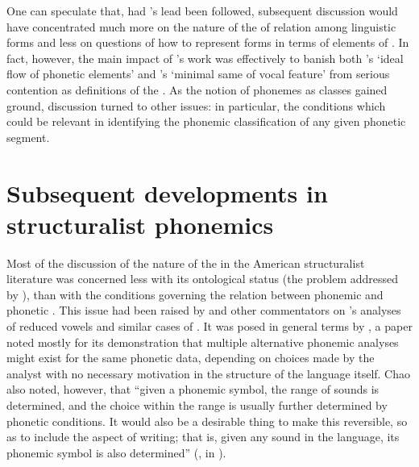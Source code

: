 One can speculate that, had {\Twaddell}'s lead been followed, subsequent
discussion would have concentrated much more on the nature of the
 of relation among linguistic forms and less on questions
of how to represent forms in terms of elements of . In fact,
however, the main impact of {\Twaddell}'s work was effectively to banish
both {\Sapir}'s `ideal flow of phonetic elements' and {\Bloomfield}'s
`minimal same of vocal feature' from serious contention as definitions
of the . As the notion of phonemes as classes gained ground,
discussion turned to other issues: in particular, the conditions which
could be relevant in identifying the phonemic classification of any
given phonetic segment.

\section{Subsequent developments in structuralist phonemics}
\label{sec:structuralists.subsequent}

Most of the discussion of the nature of the  in the American
structuralist literature was concerned less with its ontological
status (the problem addressed by {\Twaddell}), than with the conditions
governing the relation between phonemic and phonetic
. This issue had been raised by {\Trager} and other
commentators on {\Bloomfield}'s analyses of reduced vowels and similar
cases of . It was posed in general terms by
\citet{chao34:non-uniqueness}, a paper noted mostly for its
demonstration that multiple alternative phonemic analyses might exist
for the same phonetic data, depending on choices made by the analyst
with no necessary motivation in the structure of the language
itself. Chao also noted, however, that ``given a phonemic symbol, the
range of sounds is determined, and the choice within the range is
usually further determined by phonetic conditions. It would also be a
desirable thing to make this reversible, so as to include the aspect
of writing; that is, given any sound in the language, its phonemic
symbol is also determined'' (\citealt{chao34:non-uniqueness}, in
\citealt[49]{joos57:readings}).

